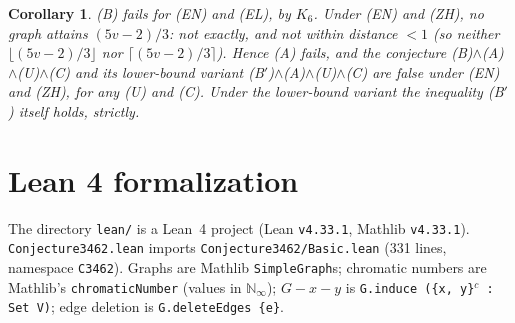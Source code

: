 \documentclass[11pt]{article}
\newtheorem{corollary}[theorem]{Corollary}
\theoremstyle{definition}
\theoremstyle{remark}
\renewcommand{\_}{\oldus\allowbreak}
\begin{document}
\begin{corollary}\label{cor:main}
(B) fails for (EN) and (EL), by $K_6$. Under (EN) and (ZH), no graph attains $(5v-2)/3$: not exactly,
and not within distance $<1$ (so neither $\lfloor(5v-2)/3\rfloor$ nor $\lceil(5v-2)/3\rceil$). Hence (A)
fails, and the conjecture (B)$\wedge$(A)$\wedge$(U)$\wedge$(C) and its lower-bound variant
(B$'$)$\wedge$(A)$\wedge$(U)$\wedge$(C) are false under (EN) and (ZH), for any (U) and (C). Under the
lower-bound variant the inequality (B$'$) itself holds, strictly.
\end{corollary}

\section{Lean 4 formalization}

The directory \texttt{lean/} is a Lean~4 project (Lean \texttt{v4.33.1}, Mathlib \texttt{v4.33.1}).
\texttt{Conjecture3462.lean} imports \texttt{Conjecture3462/Basic.lean} (331 lines, namespace
\texttt{C3462}). Graphs are Mathlib \texttt{SimpleGraph}s; chromatic numbers are Mathlib's
\texttt{chromaticNumber} (values in $\mathbb{N}_\infty$); $G-x-y$ is
\texttt{G.induce (\{x, y\}$^c$ : Set V)}; edge deletion is \texttt{G.deleteEdges \{e\}}.
\end{document}
